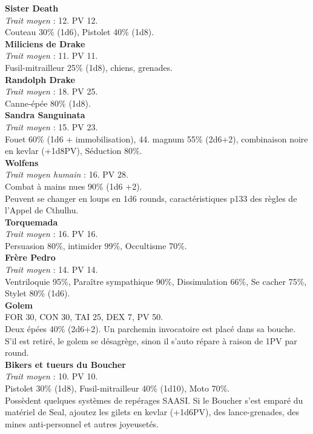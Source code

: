 \documentclass[11pt,twoside,a4paper]{book}
\begin{document}
\textbf{Sister Death}~\\
\emph{Trait moyen} : 12. PV 12.~\\
Couteau 30\% (1d6), Pistolet 40\% (1d8).~\\

\textbf{Miliciens de Drake}~\\
\emph{Trait moyen} : 11. PV 11.~\\
Fusil-mitrailleur 25\% (1d8), chiens, grenades.~\\

\textbf{Randolph Drake}~\\
\emph{Trait moyen} : 18. PV 25.~\\
Canne-{\'e}p{\'e}e 80\% (1d8).~\\

\textbf{Sandra Sanguinata}~\\
\emph{Trait moyen} : 15. PV 23.~\\
Fouet 60\% (1d6 + immobilisation), 44. magnum 55\% (2d6+2), combinaison noire en kevlar (+1d8PV), S{\'e}duction 80\%.~\\

\textbf{Wolfens}~\\
\emph{Trait moyen humain} : 16. PV 28.~\\
Combat {\`a} mains nues 90\% (1d6 +2).~\\
Peuvent se changer en loups en 1d6 rounds, caract{\'e}ristiques p133 des r{\`e}gles de l'Appel de Cthulhu.~\\

\textbf{Torquemada}~\\
\emph{Trait moyen} : 16. PV 16.~\\
Persuasion 80\%, intimider 99\%, Occultisme 70\%.~\\

\textbf{Fr{\`e}re Pedro}~\\
\emph{Trait moyen} : 14. PV 14.~\\
Ventriloquie 95\%, Para{\^i}tre sympathique 90\%, Dissimulation 66\%, Se cacher 75\%, Stylet 80\% (1d6).~\\

\textbf{Golem}~\\
FOR 30, CON 30, TAI 25, DEX 7, PV 50.~\\
Deux {\'e}p{\'e}es 40\% (2d6+2). Un parchemin invocatoire est plac{\'e} dans sa bouche. S'il est retir{\'e}, le golem se d{\'e}sagr{\`e}ge, sinon il s'auto r{\'e}pare {\`a} raison de 1PV par round.~\\

\textbf{Bikers et tueurs du Boucher}~\\
\emph{Trait moyen} : 10. PV 10.~\\
Pistolet 30\% (1d8), Fusil-mitrailleur 40\% (1d10), Moto 70\%.~\\
Poss{\`e}dent quelques syst{\`e}mes de rep{\'e}rages SAASI. Si le Boucher s'est empar{\'e} du mat{\'e}riel de Seal, ajoutez les gilets en kevlar (+1d6PV), des lance-grenades, des mines anti-personnel et autres joyeuset{\'e}s.~\\
\end{document}
